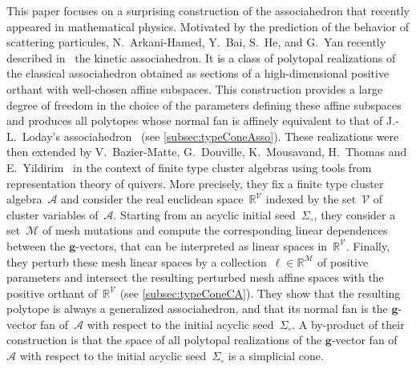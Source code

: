 \documentclass{amsart}
\theoremstyle{definition}
\newcommand{\R}{\mathbb{R}} %
\renewcommand{\c}[1]{{\mathcal{#1}}} %
\renewcommand{\b}[1]{{\boldsymbol{#1}}} %
\newcommand{\seed}{\Sigma} %
\begin{document}
This paper focuses on a surprising construction of the associahedron that recently appeared in mathematical physics.
Motivated by the prediction of the behavior of scattering particules, N.~Arkani-Hamed, Y.~Bai, S.~He, and G.~Yan recently described in~\cite[Sect.~3.2]{ArkaniHamedBaiHeYan} the kinetic associahedron.
It is a class of polytopal realizations of the classical associahedron obtained as sections of a high-dimensional positive orthant with well-chosen affine subspaces.
This construction provides a large degree of freedom in the choice of the parameters defining these affine subspaces and produces all polytopes whose normal fan is affinely equivalent to that of J.-L.~Loday's associahedron~\cite{Loday} (see \cref{subsec:typeConeAsso}).
These realizations were then extended by V.~Bazier-Matte, G.~Douville, K.~Mousavand, H.~Thomas and E.~Yildirim~\cite{BazierMatteDouvilleMousavandThomasYildirim} in the context of finite type cluster algebras using tools from representation theory of quivers.
More precisely, they fix a finite type cluster algebra~$\c{A}$ and consider the real euclidean space~$\R^\c{V}$ indexed by the set~$\c{V}$ of cluster variables of~$\c{A}$.
Starting from an acyclic initial seed~$\seed_\circ$, they consider a set~$\c{M}$ of mesh mutations and compute the corresponding linear dependences between the $\b{g}$-vectors, that can be interpreted as linear spaces in~$\R^\c{V}$.
Finally, they perturb these mesh linear spaces by a collection~$\b{\ell} \in \R^{\c{M}}$ of positive parameters and intersect the resulting perturbed mesh affine spaces with the positive orthant of~$\R^\c{V}$ (see \cref{subsec:typeConeCA}).
They show that the resulting polytope is always a generalized associahedron, and that its normal fan is the $\b{g}$-vector fan of~$\c{A}$ with respect to the initial acyclic seed~$\seed_\circ$.
A by-product of their construction is that the space of all polytopal realizations of the $\b{g}$-vector fan of~$\c{A}$ with respect to the initial acyclic seed~$\seed_\circ$ is a simplicial cone.
\end{document}

